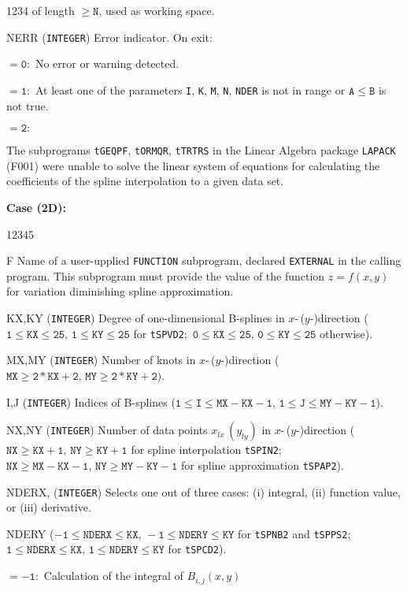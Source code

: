 \begin{DLtt}{1234}
of length $\mathtt{\ge N}$, used as working space.
\item[NERR] ({\tt INTEGER}) Error indicator. On exit:
\item[]$\mathtt{=0:}$ No error or warning detected.
\item[]$\mathtt{=1:}$
At least one of the parameters {\tt I}, {\tt K}, {\tt M}, {\tt N},
{\tt NDER} is not in range or $\mathtt{A \le B}$ is not true.
\item[]$\mathtt{=2:}$ \parbox[t]{139mm}{
The subprograms {\tt tGEQPF}, {\tt tORMQR}, {\tt tTRTRS} in the Linear
Algebra package {\tt LAPACK} (F001) were unable to solve the linear
system of equations for calculating the coefficients of the spline
interpolation to a given data set.}
\end{DLtt}
{\bf Case (2D):}
\begin{DLtt}{12345}
\item[F] Name of a user-upplied {\tt FUNCTION} subprogram,
declared {\tt EXTERNAL} in the calling program. This subprogram must
provide the value of the function $z = f(x,y)$ for
variation diminishing spline approximation.
\item[KX,KY] ({\tt INTEGER}) Degree of one-dimensional B-splines in
$x$-\,($y$-)direction ($\mathtt{1 \le KX \le 25,\,1 \le KY \le 25}$
for {\tt tSPVD2};\,
$\mathtt{0 \le KX \le 25,\,0 \le KY \le 25}$ otherwise).
\item[MX,MY] ({\tt INTEGER}) Number of knots in $x$-\,($y$-)direction
($\mathtt{MX \ge 2*KX+2,\,MY \ge 2*KY+2})$.
\item[I,J]  ({\tt INTEGER}) Indices of B-splines
($\mathtt{1 \le I \le MX-KX-1},\,\mathtt{1 \le J \le MY-KY-1}$).
\item[NX,NY] ({\tt INTEGER}) Number of data points $x_{lx}\,(y_{ly})$
in $x$-\,($y$-)direction ($\mathtt{NX \ge KX+1,\,NY \ge KY+1}$
for spline interpolation {\tt tSPIN2};\,
$\mathtt{NX \ge MX-KX-1,\,NY \ge MY-KY-1}$
for spline approximation {\tt tSPAP2}).
\item[NDERX,] ({\tt INTEGER}) Selects one out of
three cases: (i) integral, (ii) function value, or (iii) derivative.
\item[NDERY]
($\mathtt{-1 \le NDERX \le KX,\,-1 \le NDERY \le KY}$
for {\tt tSPNB2} and {\tt tSPPS2}; \\
\hspace*{3.3mm} $\mathtt{1 \le NDERX \le KX}$,
\hspace*{3.2mm}$\mathtt{1 \le NDERY \le KY}$ for {\tt tSPCD2}).
\item[]$\mathtt{=-1:}$
Calculation of the integral of $B_{i,j}(x,y)$

\end{DLtt}
